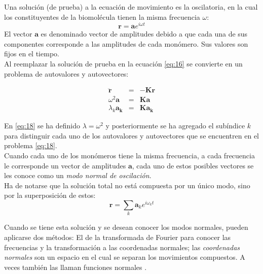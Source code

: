 Una soluci\'{o}n (de prueba) a la ecuaci\'{o}n de movimiento es la oscilatoria, en la cual los constituyentes de la biomol\'{e}cula tienen la misma frecuencia $\omega$:
\begin{equation}\label{eq:17}
\mathbf{r}=\mathbf{a}e^{i\omega t}
\end{equation}
El vector $\mathbf{a}$ es denominado vector de amplitudes debido a que cada una de sus componentes corresponde a las amplitudes de cada mon\'{o}mero. Sus valores son fijos en el tiempo.\\

Al reemplazar la soluci\'{o}n de prueba en la ecuaci\'{o}n \eqref{eq:16} se convierte en un problema de autovalores y autovectores:

\begin{eqnarray}\label{eq:18}
\ddot{\mathbf{r}}&=&-\mathbf{K}\mathbf{r} \nonumber \\
\omega^2\mathbf{a}&=&\mathbf{K}\mathbf{a} \nonumber \\
\lambda_{k}\mathbf{a_{k}}&=&\mathbf{K}\mathbf{a_{k}}
\end{eqnarray}

En \eqref{eq:18} se ha definido $\lambda=\omega^2$ y posteriormente se ha agregado el sub\'{i}ndice $k$ para distinguir cada uno de los autovalores y autovectores que se encuentren en el problema \eqref{eq:18}.\\
Cuando cada uno de los mon\'{o}meros tiene la misma frecuencia, a cada frecuencia le corresponde un vector de amplitudes $\mathbf{a}$, cada uno de estos posibles vectores se les conoce como un \textit{modo normal de oscilaci\'{o}n}.\\

Ha de notarse que la soluci\'{o}n total no est\'{a} compuesta por un \'{u}nico modo, sino por la superposici\'{o}n de estos:
\begin{equation}\label{eq:tot}
\mathbf{r}=\sum_k\mathbf{a}_ke^{i\omega_k t}
\end{equation}

Cuando se tiene esta soluci\'{o}n y se desean conocer los modos normales, pueden aplicarse dos m\'{e}todos: El de la transformada de Fourier para conocer las frecuencias y la transformaci\'{o}n a las coordenadas normales; las \textit{coordenadas normales} son un espacio en el cual se separan los movimientos compuestos. A veces tambi\'{e}n las llaman funciones normales \cite{Goldstein2001}.\\

